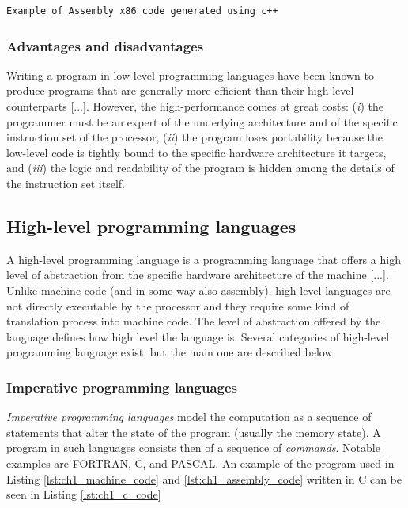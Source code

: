 \begin{lstlisting}[caption = Assembly x86 code to compute the sum of a sequence of numbers, label = lst:ch1_assembly_code]
Example of Assembly x86 code generated using c++
\end{lstlisting}

\subsubsection*{Advantages and disadvantages}
Writing a program in low-level programming languages have been known to produce programs that are generally more efficient than their high-level counterparts [...]. However, the high-performance comes at great costs: (\textit{i}) the programmer must be an expert of the underlying architecture and of the specific instruction set of the processor, (\textit{ii}) the program loses portability because the low-level code is tightly bound to the specific hardware architecture it targets, and (\textit{iii}) the logic and readability of the program is hidden among the details of the instruction set itself.

\subsection{High-level programming languages}
A high-level programming language is a programming language that offers a high level of abstraction from the specific hardware architecture of the machine [...]. Unlike machine code (and in some way also assembly), high-level languages are not directly executable by the processor and they require some kind of translation process into machine code. The level of abstraction offered by the language defines how high level the language is. Several categories of high-level programming language exist, but the main one are described below.

\subsubsection*{Imperative programming languages}
\textit{Imperative programming languages} model the computation as a sequence of statements that alter the state of the program (usually the memory state). A program in such languages consists then of a sequence of \textit{commands}. Notable examples are FORTRAN, C, and PASCAL. An example of the program used in Listing \ref{lst:ch1_machine_code} and \ref{lst:ch1_assembly_code} written in C can be seen in Listing \ref{lst:ch1_c_code}

